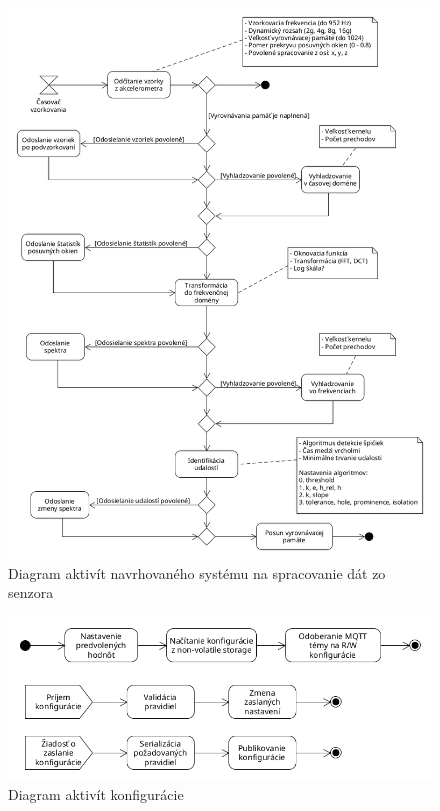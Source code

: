 \begin{figure}[h]
	\centering
	\includegraphics[width=\textwidth]{figures/design/pipeline.png}
	\caption{Diagram aktivít navrhovaného systému na spracovanie dát zo senzora}
\end{figure}

\begin{figure}[h]
	\centering
	\includegraphics[width=\textwidth]{figures/design/configuration.png}
	\caption{Diagram aktivít konfigurácie}
\end{figure}

\emptypage
